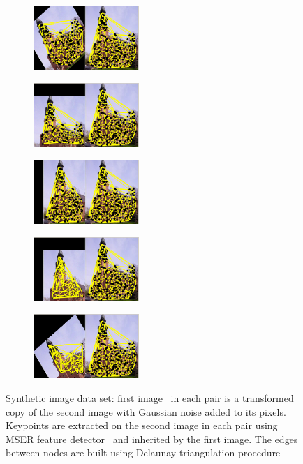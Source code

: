 \begin{figure}[h] 
		\begin{subfigure}[b]{0.3\textwidth}
			\centering
			\includegraphics[width=4cm]{"chapter3/fig/ImageTrafo/Img_pair1"} 
			\caption{}\label{fig:ImageTrafo_initGraphs_a}
		\end{subfigure}
		\begin{subfigure}[b]{0.3\textwidth}
			\centering
			\includegraphics[width=4cm]{"chapter3/fig/ImageTrafo/Img_pair2"} 
			\caption{}
		\end{subfigure} 
		\begin{subfigure}[b]{0.3\textwidth}
			\centering
			\includegraphics[width=4cm]{"chapter3/fig/ImageTrafo/Img_pair3"}
			\caption{}
		\end{subfigure} 	
		\begin{subfigure}[b]{0.5\textwidth}
			\centering
			\includegraphics[width=4cm]{"chapter3/fig/ImageTrafo/Img_pair4"} 
			\caption{}
		\end{subfigure} 
		\begin{subfigure}[b]{0.5\textwidth}
			\centering
			\includegraphics[width=4cm]{"chapter3/fig/ImageTrafo/Img_pair5"}
			\caption{}
		\end{subfigure} 	
	\caption[Synthetic image data set]{Synthetic image data set: first image~\cite{SUN} in each pair is a transformed copy of the second image with Gaussian noise added to its pixels. Keypoints are extracted on the second image in each pair using MSER feature detector~\cite{MSER} and inherited by the first image. The edges between nodes are built using Delaunay triangulation procedure~\cite{Hancock_EM_SVD,Hancock_GM_SpectralPart}}
	\label{fig:ImageTrafo_initGraphs}
\end{figure}


